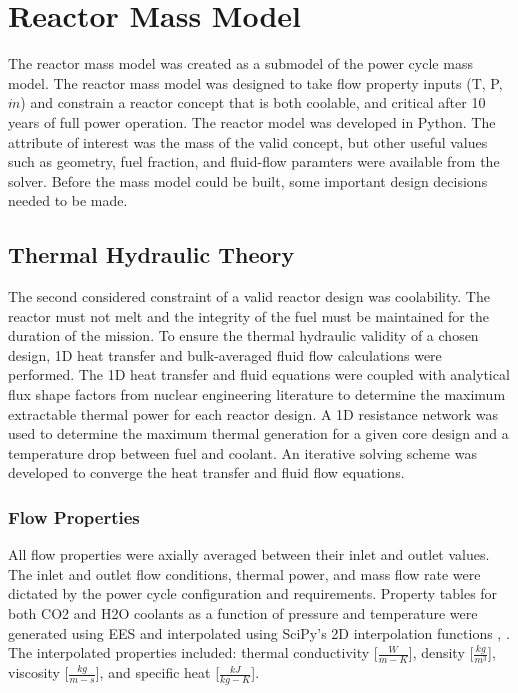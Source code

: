 \chapter{Reactor Mass Model} \label{ch:mass_model}
The reactor mass model was created as a submodel of the power cycle mass
model. The reactor mass model was designed to take flow property inputs (T, P,
$\dot{m}$) and constrain a reactor concept that is both coolable, and critical
after 10 years of full power operation. The reactor model was developed in
Python. The attribute of interest was the mass of
the valid concept, but other useful values such as geometry, fuel fraction,
and fluid-flow paramters were available from the solver. Before the mass model
could be built, some important design decisions needed to be made.


\section{Thermal Hydraulic Theory}
The second considered constraint of a valid reactor design was coolability. The reactor must
not melt and the integrity of the fuel must be maintained for the duration of
the mission. To ensure the thermal hydraulic validity of a chosen design, 
1D heat transfer and bulk-averaged fluid flow calculations were performed. The 1D
heat transfer and fluid equations were coupled with analytical flux shape
factors from nuclear engineering literature to determine the maximum extractable
thermal power for each reactor design. A 1D resistance network was used to
determine the maximum thermal generation for a given core design and a temperature
drop between fuel and coolant. An iterative solving scheme was developed to
converge the heat transfer and fluid flow equations.

\subsection{Flow Properties}
All flow properties were axially averaged between their inlet and outlet values.
The inlet and outlet flow conditions, thermal power, and mass flow rate were
dictated by the power cycle configuration and requirements. Property tables for
both CO2 and H2O coolants as a function of pressure and temperature were 
generated using EES and interpolated using SciPy's 2D interpolation functions
\citep{scipy}, \citep{EES_citation}.
The interpolated properties included: thermal conductivity [$\frac{W}{m-K}$], density
[$\frac{kg}{m^3}$], viscosity [$\frac{kg}{m-s}$], and specific heat [$\frac{kJ}{kg-K}$].

